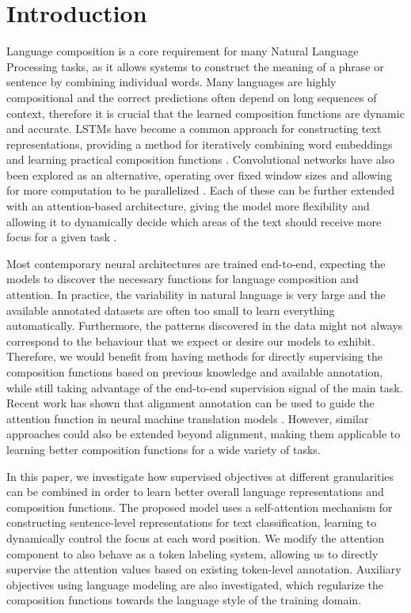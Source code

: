 \documentclass[letterpaper]{article} \usepackage{aaai19}  \usepackage{times}  \usepackage{helvet}  \usepackage{courier}  \usepackage{graphicx}
\begin{document}
\section{Introduction}

Language composition is a core requirement for many Natural Language Processing tasks, as it allows systems to construct the meaning of a phrase or sentence by combining individual words.
Many languages are highly compositional and the correct predictions often depend on long sequences of context, therefore it is crucial that the learned composition functions are dynamic and accurate.
LSTMs \citep{Hochreiter1997} have become a common approach for constructing text representations, providing a method for iteratively combining word embeddings and learning practical composition functions \citep{Sutskever2014,Huang2015,Kim2016,Melis2017}. 
Convolutional networks have also been explored as an alternative, operating over fixed window sizes and allowing for more computation to be parallelized \citep{Kim2014,Dauphin2017,Gehring2017}.
Each of these can be further extended with an attention-based architecture, giving the model more flexibility and allowing it to dynamically decide which areas of the text should receive more focus for a given task \citep{Bahdanau2015,Yang2016a}.



Most contemporary neural architectures are trained end-to-end, expecting the models to discover the necessary functions for language composition and attention. 
In practice, the variability in natural language is very large and the available annotated datasets are often too small to learn everything automatically.
Furthermore, the patterns discovered in the data might not always correspond to the behaviour that we expect or desire our models to exhibit.
Therefore, we would benefit from having methods for directly supervising the composition functions based on previous knowledge and available annotation, while still taking advantage of the end-to-end supervision signal of the main task.
Recent work has shown that alignment annotation can be used to guide the attention function in neural machine translation models \citep{liu2016neural}.
However, similar approaches could also be extended beyond alignment, making them applicable to learning better composition functions for a wide variety of tasks.


In this paper, we investigate how supervised objectives at different granularities can be combined in order to learn better overall language representations and composition functions.
The proposed model uses a self-attention mechanism for constructing sentence-level representations for text classification, learning to dynamically control the focus at each word position.
We modify the attention component to also behave as a token labeling system, allowing us to directly supervise the attention values based on existing token-level annotation.
Auxiliary objectives using language modeling are also investigated, which regularize the composition functions towards the language style of the training domain.
\end{document}
